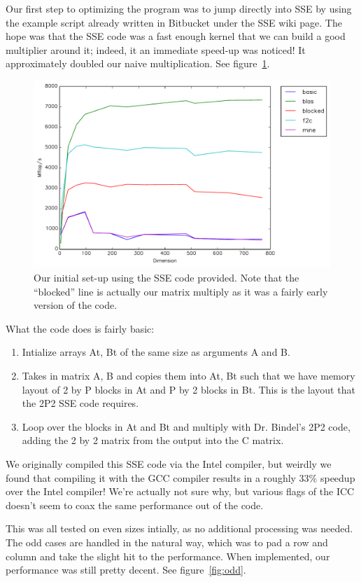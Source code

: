 \documentclass{article}
\begin{document}
  Our first step to optimizing the program was to jump directly into SSE by using the example script already written in Bitbucket under the SSE wiki page.
  The hope was that the SSE code was a fast enough kernel that we can build a good multiplier around it; indeed, it an immediate
  speed-up was noticed! It approximately doubled our naive multiplication. See figure~\ref{fig:initial}.

  \begin{figure}[h]
    \centering
    \includegraphics[width=.7\textwidth]{initial.pdf}
    \caption{Our initial set-up using the SSE code provided. Note that the ``blocked'' line is actually our matrix multiply as it was a fairly early version of the code.}
    \label{fig:initial}
  \end{figure}

  What the code does is fairly basic:
  \begin{enumerate}
    \item Intialize arrays At, Bt of the same size as arguments A and B.
    \item Takes in matrix A, B and copies them into At, Bt such that we have memory layout of 2 by P blocks in At and P by 2 blocks in Bt.
      This is the layout that the 2P2 SSE code requires.
    \item Loop over the blocks in At and Bt and multiply with Dr. Bindel's 2P2 code, adding the 2 by 2 matrix from the output into the C matrix.
  \end{enumerate}

  We originally compiled this SSE code via the Intel compiler, but weirdly we found that compiling it with the GCC compiler results in a roughly
  33\% speedup over the Intel compiler! We're actually not sure why, but various flags of the ICC doesn't seem to coax the same performance
  out of the code.

  This was all tested on even sizes intially, as no additional processing was needed. The odd cases
  are handled in the natural way, which was to pad a row and column and take the slight hit to the performance.
  When implemented, our performance was still pretty decent. See figure~\ref{fig:odd}.
\end{document}
